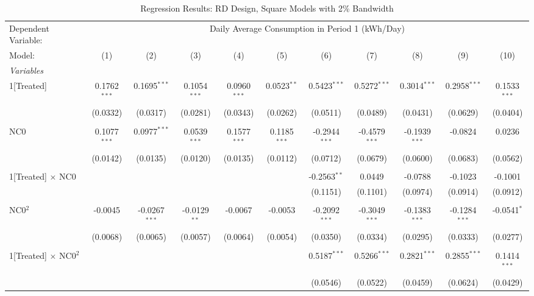 \begin{table}[htbp]
\centering
\caption{\label{Table:Regression-Results_RD_Square_BW-2} Regression Results: RD Design, Square Models with 2\% Bandwidth}
\begin{adjustbox}{scale = 0.75}
\begin{tabular}{lcccccccccc}
\tabularnewline\toprule\toprule
Dependent Variable:&\multicolumn{10}{c}{Daily Average Consumption in Period 1 (kWh/Day)}\\
Model:&(1) & (2) & (3) & (4) & (5) & (6) & (7) & (8) & (9) & (10)\\
\midrule
\emph{Variables}&   &   &   &   &   &   &   &   &   &  \\
1[Treated]&0.1762$^{***}$ & 0.1695$^{***}$ & 0.1054$^{***}$ & 0.0960$^{***}$ & 0.0523$^{**}$ & 0.5423$^{***}$ & 0.5272$^{***}$ & 0.3014$^{***}$ & 0.2958$^{***}$ & 0.1533$^{***}$\\
  &(0.0332) & (0.0317) & (0.0281) & (0.0343) & (0.0262) & (0.0511) & (0.0489) & (0.0431) & (0.0629) & (0.0404)\\
&   &   &   &   &   &   &   &   &   &  \\
NC0&0.1077$^{***}$ & 0.0977$^{***}$ & 0.0539$^{***}$ & 0.1577$^{***}$ & 0.1185$^{***}$ & -0.2944$^{***}$ & -0.4579$^{***}$ & -0.1939$^{***}$ & -0.0824 & 0.0236\\
  &(0.0142) & (0.0135) & (0.0120) & (0.0135) & (0.0112) & (0.0712) & (0.0679) & (0.0600) & (0.0683) & (0.0562)\\
&   &   &   &   &   &   &   &   &   &  \\
1[Treated] $\times $ NC0&   &    &    &    &    & -0.2563$^{**}$ & 0.0449 & -0.0788 & -0.1023 & -0.1001\\
  &   &    &    &    &    & (0.1151) & (0.1101) & (0.0974) & (0.0914) & (0.0912)\\
&   &   &   &   &   &   &   &   &   &  \\
NC0$^2$&-0.0045 & -0.0267$^{***}$ & -0.0129$^{**}$ & -0.0067 & -0.0053 & -0.2092$^{***}$ & -0.3049$^{***}$ & -0.1383$^{***}$ & -0.1284$^{***}$ & -0.0541$^{*}$\\
  &(0.0068) & (0.0065) & (0.0057) & (0.0064) & (0.0054) & (0.0350) & (0.0334) & (0.0295) & (0.0333) & (0.0277)\\
&   &   &   &   &   &   &   &   &   &  \\
1[Treated] $\times $ NC0$^2$&   &    &    &    &    & 0.5187$^{***}$ & 0.5266$^{***}$ & 0.2821$^{***}$ & 0.2855$^{***}$ & 0.1414$^{***}$\\
  &   &    &    &    &    & (0.0546) & (0.0522) & (0.0459) & (0.0624) & (0.0429)\\

\end{tabular}
\end{adjustbox}
\end{table}

